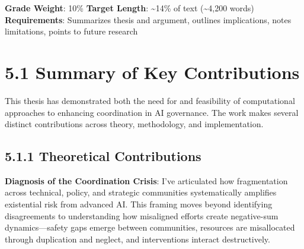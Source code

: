 \documentclass[
  11pt,
  letterpaper,
]{book}
\begin{document}

\begin{tcolorbox}[enhanced jigsaw, opacitybacktitle=0.6, colbacktitle=quarto-callout-note-color!10!white, toptitle=1mm, colback=white, breakable, left=2mm, bottomrule=.15mm, title=\textcolor{quarto-callout-note-color}{\faInfo}\hspace{0.5em}{Chapter Overview}, rightrule=.15mm, arc=.35mm, toprule=.15mm, opacityback=0, colframe=quarto-callout-note-color-frame, bottomtitle=1mm, titlerule=0mm, leftrule=.75mm, coltitle=black]

\textbf{Grade Weight}: 10\% \textbar{} \textbf{Target Length}:
\textasciitilde14\% of text (\textasciitilde4,200 words)\\
\textbf{Requirements}: Summarizes thesis and argument, outlines
implications, notes limitations, points to future research

\end{tcolorbox}

\section*{5.1 Summary of Key Contributions}\label{sec-key-contributions}


This thesis has demonstrated both the need for and feasibility of
computational approaches to enhancing coordination in AI governance. The
work makes several distinct contributions across theory, methodology,
and implementation.

\subsection*{5.1.1 Theoretical
Contributions}\label{sec-theoretical-contributions}

\textbf{Diagnosis of the Coordination Crisis}: I've articulated how
fragmentation across technical, policy, and strategic communities
systematically amplifies existential risk from advanced AI. This framing
moves beyond identifying disagreements to understanding how misaligned
efforts create negative-sum dynamics---safety gaps emerge between
communities, resources are misallocated through duplication and neglect,
and interventions interact destructively.
\end{document}
